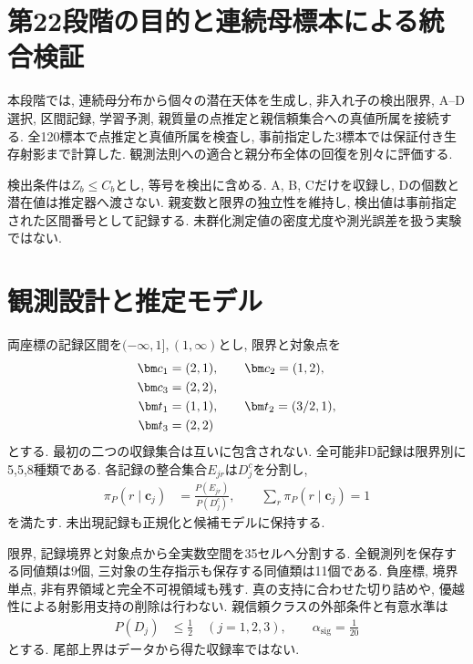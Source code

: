
\section{第22段階の目的と連続母標本による統合検証}
\label{sec:stage22_scope}

本段階では, 連続母分布から個々の潜在天体を生成し,
非入れ子の検出限界, A--D選択, 区間記録,
学習予測, 親質量の点推定と親信頼集合への真値所属を接続する.
全120標本で点推定と真値所属を検査し,
事前指定した3標本では保証付き生存射影まで計算した.
観測法則への適合と親分布全体の回復を別々に評価する.

検出条件は$Z_b\le C_b$とし, 等号を検出に含める.
A, B, Cだけを収録し, Dの個数と潜在値は推定器へ渡さない.
親変数と限界の独立性を維持し,
検出値は事前指定された区間番号として記録する.
未群化測定値の密度尤度や測光誤差を扱う実験ではない.

\section{観測設計と推定モデル}
\label{sec:stage22_design}

両座標の記録区間を$(-\infty,1],(1,\infty)$とし,
限界と対象点を
\begin{align}
\bm c_1&=(2,1),\qquad \bm c_2=(1,2),\notag\\
\bm c_3&=(2,2),
\label{eq:stage22_limits}\\
\bm t_1&=(1,1),\qquad \bm t_2=(3/2,1),\notag\\
\bm t_3&=(2,2)
\label{eq:stage22_targets}
\end{align}
とする. 最初の二つの収録集合は互いに包含されない.
全可能非D記録は限界別に5,5,8種類である.
各記録の整合集合$E_{jr}$は$D_j^c$を分割し,
\begin{align}
\pi_P(r\mid\bm c_j)&=\frac{P(E_{jr})}{P(D_j^c)},\qquad
\sum_r\pi_P(r\mid\bm c_j)=1
\label{eq:stage22_record_law}
\end{align}
を満たす. 未出現記録も正規化と候補モデルに保持する.

限界, 記録境界と対象点から全実数空間を35セルへ分割する.
全観測列を保存する同値類は9個,
三対象の生存指示も保存する同値類は11個である.
負座標, 境界単点, 非有界領域と完全不可視領域も残す.
真の支持に合わせた切り詰めや, 優越性による射影用支持の削除は行わない.
親信頼クラスの外部条件と有意水準は
\begin{align}
P(D_j)&\le\frac12\quad(j=1,2,3),\qquad
\alpha_{\mathrm{sig}}=\frac1{20}
\label{eq:stage22_tail_class}
\end{align}
とする. 尾部上界はデータから得た収録率ではない.

